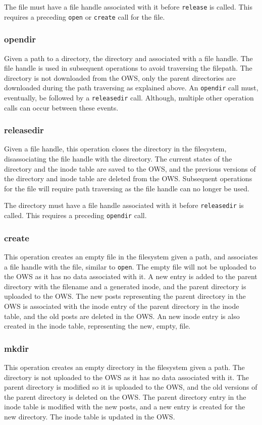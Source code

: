 The file must have a file handle associated with it before \texttt{release} is called. This requires a preceding \texttt{open} or \texttt{create} call for the file.

\subsubsection{opendir}
Given a path to a directory, the directory and associated with a file handle. The file handle is used in subsequent operations to avoid traversing the filepath. The directory is not downloaded from the OWS, only the parent directories are downloaded during the path traversing as explained above. An \texttt{opendir} call must, eventually, be followed by a \texttt{releasedir} call. Although, multiple other operation calls can occur between these events.

\subsubsection{releasedir}
Given a file handle, this operation closes the directory in the filesystem, disassociating the file handle with the directory. The current states of the directory and the inode table are saved to the OWS, and the previous versions of the directory and inode table are deleted from the OWS. Subsequent operations for the file will require path traversing as the file handle can no longer be used.

The directory must have a file handle associated with it before \texttt{releasedir} is called. This requires a preceding \texttt{opendir} call.

\subsubsection{create}
This operation creates an empty file in the filesystem given a path, and associates a file handle with the file, similar to \texttt{open}. The empty file will not be uploaded to the OWS as it has no data associated with it. A new entry is added to the parent directory with the filename and a generated inode, and the parent directory is uploaded to the OWS. The new posts representing the parent directory in the OWS is associated with the inode entry of the parent directory in the inode table, and the old posts are deleted in the OWS. An new inode entry is also created in the inode table, representing the new, empty, file.

\subsubsection{mkdir}
This operation creates an empty directory in the filesystem given a path. The directory is not uploaded to the OWS as it has no data associated with it. The parent directory is modified so it is uploaded to the OWS, and the old versions of the parent directory is deleted on the OWS. The parent directory entry in the inode table is modified with the new posts, and a new entry is created for the new directory. The inode table is updated in the OWS.

